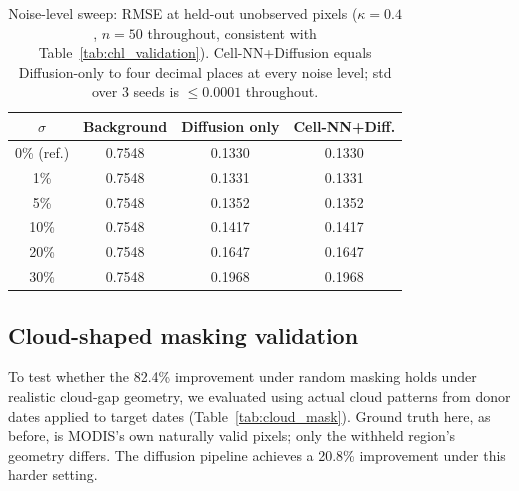 \documentclass[final,5p,times,twocolumn,authoryear]{elsarticle}
\begin{document}
\begin{table}[t]
\centering
\small
\caption{Noise-level sweep: RMSE at held-out unobserved pixels
($\kappa=0.4$, $n=50$ throughout, consistent with
Table~\ref{tab:chl_validation}). Cell-NN+Diffusion equals
Diffusion-only to four decimal places at every noise level; std
over 3 seeds is $\leq 0.0001$ throughout.}
\label{tab:noisy_modis}
\begin{tabular}{cccc}
\toprule
$\sigma$ & Background & Diffusion only & Cell-NN+Diff. \\
\midrule
0\% (ref.) & 0.7548 & 0.1330 & 0.1330 \\
1\%  & 0.7548 & 0.1331 & 0.1331 \\
5\%  & 0.7548 & 0.1352 & 0.1352 \\
10\% & 0.7548 & 0.1417 & 0.1417 \\
20\% & 0.7548 & 0.1647 & 0.1647 \\
30\% & 0.7548 & 0.1968 & 0.1968 \\
\bottomrule
\end{tabular}
\end{table}

\subsection{Cloud-shaped masking validation}
\label{sec:cloudmask}

To test whether the 82.4\% improvement under random masking holds under realistic
cloud-gap geometry, we evaluated using actual cloud patterns from
donor dates applied to target dates (Table~\ref{tab:cloud_mask}).
Ground truth here, as before, is MODIS's own naturally valid pixels;
only the withheld region's geometry differs. The diffusion pipeline
achieves a 20.8\% improvement under this harder setting.
\end{document}
